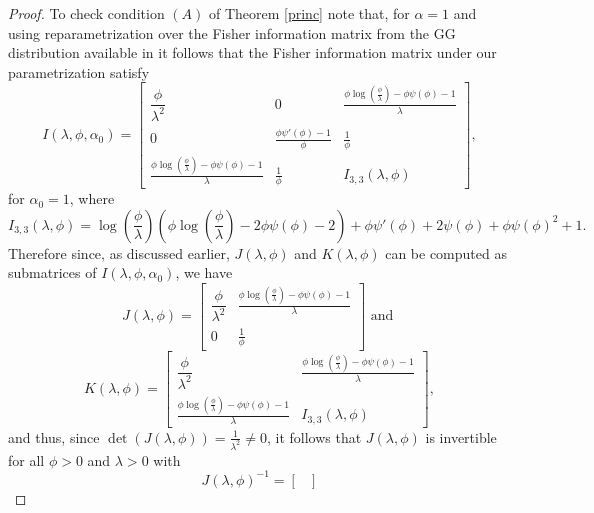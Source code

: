 \documentclass[10pt,a4paper,onecolumn]{article} %
\begin{document}
\begin{proof}
To check condition $(A)$ of Theorem \ref{princ} note that, for $\alpha=1$ and using reparametrization over the Fisher information matrix from the GG distribution available in \cite{1970-Hager} it follows that the Fisher information matrix under our parametrization satisfy
\begin{equation}\label{mfishergg}
I(\lambda,\phi,\alpha_0)=
\begin{bmatrix}
\dfrac{\phi}{\lambda^2}  & 0 & \frac{\phi \log\left(\frac{\phi}{\lambda}\right) - \phi\psi(\phi) - 1}{\lambda} \\
 0 & \frac{\phi\psi'(\phi) - 1}{\phi}  & \frac{1}{\phi}  \\
\frac{\phi \log\left(\frac{\phi}{\lambda}\right) - \phi\psi(\phi) - 1}{\lambda} &  \frac{1}{\phi} & I_{3,3}(\lambda,\phi)
\end{bmatrix},
\end{equation}
for $\alpha_0=1$, where
\begin{equation*}
I_{3,3}(\lambda,\phi) = \log\left(\frac{\phi}{\lambda}\right)\left(\phi\log\left(\frac{\phi}{\lambda}\right) -2\phi\psi(\phi)-2\right) + \phi\psi'(\phi) + 2\psi(\phi) + \phi\psi(\phi)^2 + 1.
\end{equation*}
Therefore since, as discussed earlier, $J(\lambda,\phi)$ and $K(\lambda,\phi)$ can be computed as submatrices of $I(\lambda,\phi,\alpha_0)$, we have
\begin{equation}\label{mfishergg2}
J(\lambda,\phi)=
\begin{bmatrix}
 \dfrac{\phi}{\lambda^2}  & \frac{\phi \log\left(\frac{\phi}{\lambda}\right) - \phi\psi(\phi) - 1}{\lambda}\\
 0 &  \frac{1}{\phi}
\end{bmatrix}\mbox{ and } 
\end{equation}
\begin{equation*}
K(\lambda,\phi)=\begin{bmatrix}
 \dfrac{\phi}{\lambda^2}  & \frac{\phi \log\left(\frac{\phi}{\lambda}\right) - \phi\psi(\phi) - 1}{\lambda}\\
 \frac{\phi \log\left(\frac{\phi}{\lambda}\right) - \phi\psi(\phi) - 1}{\lambda} &  I_{3,3}(\lambda,\phi)
\end{bmatrix},
\end{equation*}
and thus, since $\det(J(\lambda,\phi))=\frac{1}{\lambda^2}\neq 0$, it follows that $J(\lambda,\phi)$ is invertible for all $\phi>0$ and $\lambda>0$ with
\begin{equation*}
J(\lambda,\phi)^{-1}=\begin{bmatrix}

\end{bmatrix}
\end{equation*}
\end{proof}
\end{document}
